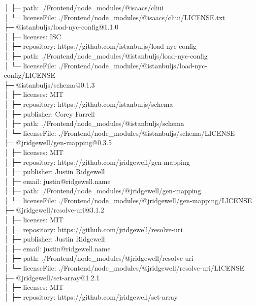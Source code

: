│  ├─ path: ./Frontend/node\_modules/@isaacs/cliui\\
│  └─ licenseFile: ./Frontend/node\_modules/@isaacs/cliui/LICENSE.txt\\
├─ @istanbuljs/load-nyc-config@1.1.0\\
│  ├─ licenses: ISC\\
│  ├─ repository: https://github.com/istanbuljs/load-nyc-config\\
│  ├─ path: ./Frontend/node\_modules/@istanbuljs/load-nyc-config\\
│  └─ licenseFile: ./Frontend/node\_modules/@istanbuljs/load-nyc-config/LICENSE\\
├─ @istanbuljs/schema@0.1.3\\
│  ├─ licenses: MIT\\
│  ├─ repository: https://github.com/istanbuljs/schema\\
│  ├─ publisher: Corey Farrell\\
│  ├─ path: ./Frontend/node\_modules/@istanbuljs/schema\\
│  └─ licenseFile: ./Frontend/node\_modules/@istanbuljs/schema/LICENSE\\
├─ @jridgewell/gen-mapping@0.3.5\\
│  ├─ licenses: MIT\\
│  ├─ repository: https://github.com/jridgewell/gen-mapping\\
│  ├─ publisher: Justin Ridgewell\\
│  ├─ email: justin@ridgewell.name\\
│  ├─ path: ./Frontend/node\_modules/@jridgewell/gen-mapping\\
│  └─ licenseFile: ./Frontend/node\_modules/@jridgewell/gen-mapping/LICENSE\\
├─ @jridgewell/resolve-uri@3.1.2\\
│  ├─ licenses: MIT\\
│  ├─ repository: https://github.com/jridgewell/resolve-uri\\
│  ├─ publisher: Justin Ridgewell\\
│  ├─ email: justin@ridgewell.name\\
│  ├─ path: ./Frontend/node\_modules/@jridgewell/resolve-uri\\
│  └─ licenseFile: ./Frontend/node\_modules/@jridgewell/resolve-uri/LICENSE\\
├─ @jridgewell/set-array@1.2.1\\
│  ├─ licenses: MIT\\
│  ├─ repository: https://github.com/jridgewell/set-array\\
